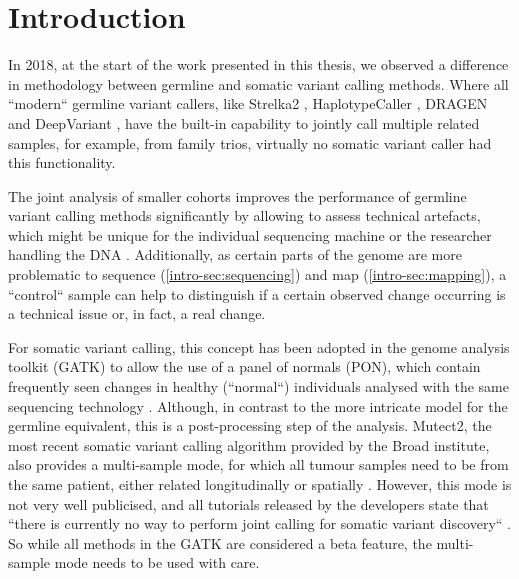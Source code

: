 \section{Introduction}
\label{variantcalling-sec:intro}
In 2018, at the start of the work presented in this thesis, we observed a difference in methodology  between germline and somatic variant calling methods. Where all ``modern`` germline variant callers, like Strelka2 \cite{Kim2018}, HaplotypeCaller \cite{Poplin2017}, DRAGEN \cite{Miller2015} and DeepVariant \cite{Poplin2018},  have the built-in capability to jointly call multiple related samples, for example, from family trios, virtually no somatic variant caller had this functionality. 

The joint analysis of smaller cohorts improves the performance of germline variant calling methods significantly by allowing to assess technical artefacts, which might be unique for the individual sequencing machine or the researcher handling the DNA \cite{Schirmer2016,Stoler2021}. Additionally, as certain parts of the genome are more problematic to sequence (\autoref{intro-sec:sequencing}) and map (\autoref{intro-sec:mapping}), a ``control`` sample can help to distinguish if a certain observed change  occurring is a technical issue or, in fact, a real change.

For somatic variant calling, this concept has been adopted in the genome analysis toolkit (GATK) \cite{BrianOConnor2020} to allow the use of a panel of normals (PON), which contain frequently seen changes in healthy (``normal``) individuals analysed with the same sequencing technology \cite{GATKTeam2021}. Although, in contrast to the  more intricate model for the germline equivalent, this is a post-processing step of the analysis. Mutect2, the most recent somatic variant calling algorithm provided by the Broad institute, also provides a multi-sample mode, for which all tumour samples need to be from the same patient, either related longitudinally or spatially \cite{GATKTeam2020}. However, this mode is not very well publicised, and all tutorials released by the developers state that ``there is currently no way to perform joint calling for somatic variant discovery`` \cite{GATKTeam2021a}. So while all methods in the GATK are considered a beta feature, the multi-sample mode needs to be used with care.

